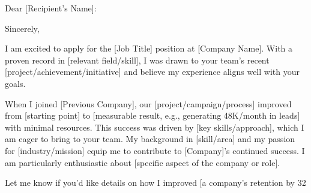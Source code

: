 \documentclass[11pt,a4paper,roman]{moderncv}
\begin{document}
\date{\today}


\opening{Dear [Recipient's Name]:}

\closing{Sincerely,}


\makelettertitle


I am excited to apply for the [Job Title] position at [Company Name]. With a proven record in [relevant field/skill], I was drawn to your team's recent [project/achievement/initiative] and believe my experience aligns well with your goals.

When I joined [Previous Company], our [project/campaign/process] improved from [starting point] to [measurable result, e.g., generating 48K/month in leads] with minimal resources. This success was driven by [key skills/approach], which I am eager to bring to your team.
My background in [skill/area] and my passion for [industry/mission] equip me to contribute to [Company]'s continued success. I am particularly enthusiastic about [specific aspect of the company or role].

Let me know if you'd like details on how I improved [a company’s retention by 32%

\vspace{0.5cm}

\makeletterclosing

\end{document}
